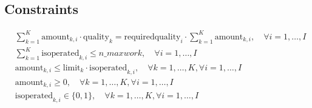 \documentclass{article}
\begin{document}
\subsection*{Constraints}
\begin{align*}
& \sum_{k=1}^{K} \text{amount}_{k,i} \cdot \text{quality}_{k} = \text{requiredquality}_{i} \cdot \sum_{k=1}^{K} \text{amount}_{k,i}, \quad \forall i = 1, \ldots, I \\
& \sum_{k=1}^{K} \text{isoperated}_{k,i} \leq n\_maxwork, \quad \forall i = 1, \ldots, I \\
& \text{amount}_{k,i} \leq \text{limit}_{k} \cdot \text{isoperated}_{k,i}, \quad \forall k = 1, \ldots, K, \forall i = 1, \ldots, I \\
& \text{amount}_{k,i} \geq 0, \quad \forall k = 1, \ldots, K, \forall i = 1, \ldots, I \\
& \text{isoperated}_{k,i} \in \{0, 1\}, \quad \forall k = 1, \ldots, K, \forall i = 1, \ldots, I 
\end{align*}
\end{document}
